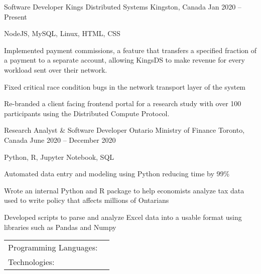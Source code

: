\documentclass[]{awesome-cv}
\begin{document}
\vspace{-2mm}
\begin{cventries}
	\cventry
	{Software Developer}
	{Kings Distributed Systems}
	{Kingston, Canada}
	{Jan 2020 – Present}
	{\begin{cvitems}
		\item {NodeJS, MySQL, Linux, HTML, CSS}
		\item {Implemented payment commissions, a feature that transfers a specified fraction of a payment to a separate account, allowing KingsDS to make revenue for every workload sent over their network.}
		\item {Fixed critical race condition bugs in the network transport layer of the system}
		\item {Re-branded a client facing frontend portal for a research study with over 100 participants using the Distributed Compute Protocol.}
		\end{cvitems}}
	\cventry
	{Research Analyst \& Software Developer}
	{Ontario Ministry of Finance}
	{Toronto, Canada}
	{June 2020 – December 2020}
	{\begin{cvitems}
		\item {Python, R, Jupyter Notebook, SQL}
		\item {Automated data entry and modeling using Python reducing time by 99\%}
		\item {Wrote an internal Python and R package to help economists analyze tax data used to write policy that affects millions of Ontarians}
		\item {Developed scripts to parse and analyze Excel data into a usable format using libraries such as Pandas and Numpy}
		\end{cvitems}}
\end{cventries}
\begin{cventries}
	\cventry
	{}
	{\def\arraystretch{1.15}{\begin{tabular}{ l l }
		Programming Languages:  & {\skill{ JavaScript, C, Python, Kotlin, Java, Shell / Bash, SQL, R, Perl}} \\
		Technologies:  & {\skill{ Node.js, Linux / Unix, Android Studio, Linux Containers, Express.js, Tensorflow}} \\
		\end{tabular}}}
	{}
	{}
	{}
\end{cventries}
\end{document}
